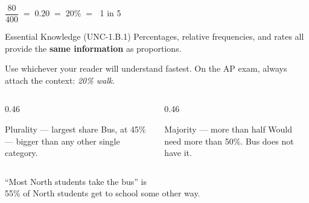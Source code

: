 \documentclass[aspectratio=169, 11pt]{beamer}
\begin{document}
\begin{frame}[t, plain]
  \vspace{10pt}
  \begin{center}
    {\Large $\dfrac{80}{400} \;=\; 0.20 \;=\; 20\% \;=\;$ 1 in 5}
  \end{center}
  \vspace{14pt}
  \begin{block}{Essential Knowledge (UNC-1.B.1)}
    Percentages, relative frequencies, and rates all provide the \textbf{same information}
    as proportions.
  \end{block}
  \vspace{6pt}
  {\small Use whichever your reader will understand fastest. On the AP exam, always attach
  the context: \emph{20\%  walk}.}
\end{frame}
\begin{frame}[t, plain]
  \vspace{8pt}
  \begin{columns}[t]
    \begin{column}{0.46\textwidth}
      \begin{block}{Plurality --- largest share}
        Bus, at 45\% --- bigger than any other single category.
      \end{block}
    \end{column}
    \begin{column}{0.46\textwidth}
      \begin{block}{Majority --- more than half}
        Would need more than 50\%. Bus does not have it.
      \end{block}
    \end{column}
  \end{columns}
  \vspace{16pt}
  \begin{center}
    {\large ``Most North students take the bus'' is }\\[8pt]
    {\small\color{slate} 55\% of North students get to school some other way.}
  \end{center}
\end{frame}
\end{document}
